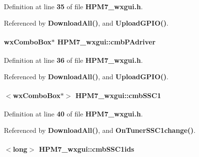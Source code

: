 Definition at line {\bf 35} of file {\bf H\+P\+M7\+\_\+wxgui.\+h}.



Referenced by {\bf Download\+All()}, and {\bf Upload\+G\+P\+I\+O()}.

\paragraph[{cmb\+P\+Adriver}]{\setlength{\rightskip}{0pt plus 5cm}wx\+Combo\+Box$\ast$ H\+P\+M7\+\_\+wxgui\+::cmb\+P\+Adriver\hspace{0.3cm}{\ttfamily [protected]}}\label{classHPM7__wxgui_a53977facbc74aca84423e3111b86ffee}


Definition at line {\bf 36} of file {\bf H\+P\+M7\+\_\+wxgui.\+h}.



Referenced by {\bf Download\+All()}, and {\bf Upload\+G\+P\+I\+O()}.

\paragraph[{cmb\+S\+S\+C1}]{$<$wx\+Combo\+Box$\ast$$>$ H\+P\+M7\+\_\+wxgui\+::cmb\+S\+S\+C1\hspace{0.3cm}{\ttfamily [protected]}}\label{classHPM7__wxgui_a8014cbda3e42a9497917ae6fd62eeea4}


Definition at line {\bf 40} of file {\bf H\+P\+M7\+\_\+wxgui.\+h}.



Referenced by {\bf Download\+All()}, and {\bf On\+Tuner\+S\+S\+C1change()}.

\paragraph[{cmb\+S\+S\+C1ids}]{$<$long$>$ H\+P\+M7\+\_\+wxgui\+::cmb\+S\+S\+C1ids\hspace{0.3cm}{\ttfamily [private]}}\label{classHPM7__wxgui_a70dd5c0332179137bd7f42dc99302d16}


